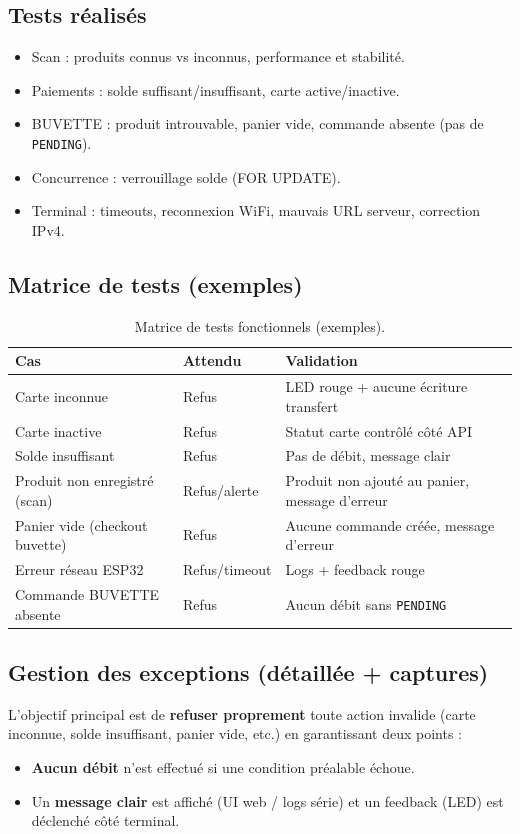 \documentclass[12pt,a4paper]{report}
\begin{document}
\subsection{Tests réalisés}
\begin{itemize}
  \item Scan : produits connus vs inconnus, performance et stabilité.
  \item Paiements : solde suffisant/insuffisant, carte active/inactive.
  \item BUVETTE : produit introuvable, panier vide, commande absente (pas de \texttt{PENDING}).
  \item Concurrence : verrouillage solde (FOR UPDATE).
  \item Terminal : timeouts, reconnexion WiFi, mauvais URL serveur, correction IPv4.
\end{itemize}

\subsection{Matrice de tests (exemples)}
\begin{table}[H]
\centering
\begin{tabular}{p{} p{} p{}}
\toprule
\textbf{Cas} & \textbf{Attendu} & \textbf{Validation}\\
\midrule
Carte inconnue & Refus & LED rouge + aucune écriture transfert\\
Carte inactive & Refus & Statut carte contrôlé côté API\\
Solde insuffisant & Refus & Pas de débit, message clair\\
Produit non enregistré (scan) & Refus/alerte & Produit non ajouté au panier, message d’erreur\\
Panier vide (checkout buvette) & Refus & Aucune commande créée, message d’erreur\\
Erreur réseau ESP32 & Refus/timeout & Logs + feedback rouge\\
Commande BUVETTE absente & Refus & Aucun débit sans \texttt{PENDING}\\
\bottomrule
\end{tabular}
\caption{Matrice de tests fonctionnels (exemples).}
\end{table}

\subsection{Gestion des exceptions (détaillée + captures)}
L’objectif principal est de \textbf{refuser proprement} toute action invalide (carte inconnue, solde insuffisant, panier vide, etc.) en garantissant deux points :
\begin{itemize}
  \item \textbf{Aucun débit} n’est effectué si une condition préalable échoue.
  \item Un \textbf{message clair} est affiché (UI web / logs série) et un feedback (LED) est déclenché côté terminal.
\end{itemize}
\end{document}
